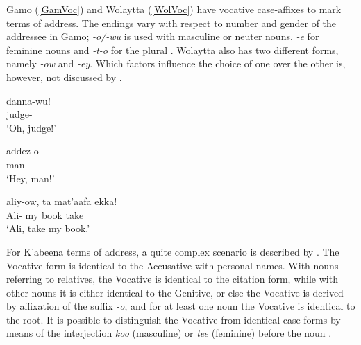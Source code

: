 
Gamo (\ref{GamVoc}) and Wolaytta (\ref{WolVoc}) have vocative case-affixes to mark terms of address. 
The endings vary with respect to number and gender of the addressee in Gamo;  \emph{-o/-wu} is used with masculine or neuter nouns, \emph{-e} for feminine nouns and \emph{-t-o} for the plural \citep[382--383]{Hompo:1990}.
Wolaytta also has two different forms, namely \emph{-ow} and \emph{-ey}. 
Which factors influence the choice of one over the other is, however, not discussed by \citet[66]{Lamberti:1997}.

\begin{exe}\ex\label{GamVoc}
\begin{xlist}
\ex\gll danna-wu!\\
judge-\voc{}\\
\glt `Oh, judge!'

\ex\gll addez-o\\
man-\voc{}\\
\glt `Hey, man!'
\end{xlist}
\end{exe}

\begin{exe}\ex\label{WolVoc}
\gll aliy-ow, ta mat'aafa ekka!\\
Ali-\voc{} my book take\\
\glt `Ali, take my book.'
\end{exe}

For K'abeena terms of address, a quite complex scenario is described by \citet{Crass:2005}.
The Vocative form is identical to the {Accusative} with personal names.
With nouns referring to relatives, the {Vocative} is identical to the citation form, while with other nouns it is either identical to the {Genitive}, or else the Vocative is derived by affixation of the suffix \emph{-o}, and for at least one noun the {Vocative} is identical to the root. 
It is possible to distinguish the {Vocative} from identical case-forms by means of the interjection \emph{koo} (masculine) or \emph{tee}  (feminine) before the noun  \citep[95--96]{Crass:2005}. 

